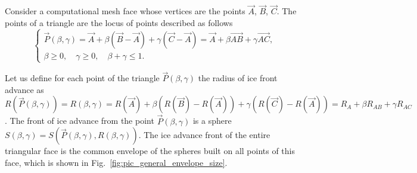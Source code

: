 \documentclass[
11pt,
tightenlines,
twoside,
onecolumn,
nofloats,
nobibnotes,
nofootinbib,
superscriptaddress,
noshowpacs,
centertags]
{revtex4}
\begin{document}
Consider a computational mesh face whose vertices are the points $\vec{A}$, $\vec{B}$, $\vec{C}$.
The points of a triangle are the locus of points described as
follows
\begin{equation*}
\begin{cases}
\vec{P}(\beta, \gamma) = \vec{A} + \beta (\vec{B} - \vec{A}) + \gamma (\vec{C} -
\vec{A}) = \vec{A} + \beta \vec{AB} + \gamma \vec{AC}, \\
\beta \ge 0, \quad \gamma \ge 0, \quad \beta + \gamma \le 1.
\end{cases}
\end{equation*}

Let us define for each point of the triangle $\vec{P}(\beta, \gamma)$ the radius of ice front advance as $R(\vec{P}(\beta, \gamma)) = R(\beta, \gamma) = R(\vec{A}) + \beta (R(\vec{B}) - R(\vec{A})) + \gamma (R(\vec{C}) - R(\vec{A} )) = R_A + \beta R_{AB} + \gamma R_{AC}$.
The front of ice advance from the point $\vec{P}(\beta, \gamma)$ is a sphere $S(\beta, \gamma) = S(\vec{P}(\beta, \gamma), R(\beta,\gamma))$.
The ice advance front of the entire triangular face is  the common
envelope of the spheres built on all points of this face, which is
shown in Fig.~\ref{fig:pic_general_envelope_size}.
\end{document}
